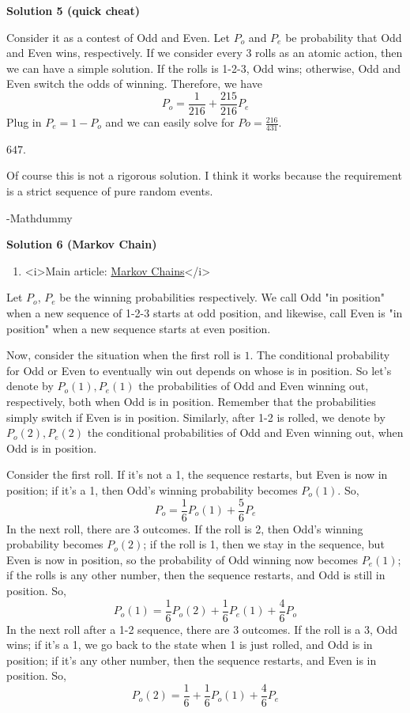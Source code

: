 \begin{enumerate}
 



\textbf{Solution 5 (quick cheat)}

Consider it as a contest of Odd and Even. Let $P_o$ and $P_e$ be probability that Odd and Even wins, respectively. If we consider every 3 rolls as an atomic action, then we can have a simple solution. If the rolls is 1-2-3, Odd wins; otherwise, Odd and Even switch the odds of winning. Therefore, we have
 \[P_o = \frac{1}{216} + \frac{215}{216}P_e\]Plug in $P_e = 1 - P_o$ and we can easily solve for $Po=\frac{216}{431}$. 

 $\boxed{647}$.

 Of course this is not a rigorous solution. I think it works because the requirement is a strict sequence of pure random events.

 -Mathdummy

 



\textbf{Solution 6 (Markov Chain)}


            \begin{enumerate}[label=(\roman*)]
                \item <i>Main article: \href{https://artofproblemsolving.com/wiki/index.php?title=Markov\_Chains}{Markov Chains}</i>
            \end{enumerate}
            Let $P_o$, $P_e$ be the winning probabilities respectively. We call Odd "in position" when a new sequence of 1-2-3 starts at odd position, and likewise, call Even is "in position" when a new sequence starts at even position. 

 Now, consider the situation when the first roll is $1.$ The conditional probability for Odd or Even to eventually win out depends on whose is in position. So let's denote by $P_o(1), P_e(1)$ the probabilities of Odd and Even winning out, respectively, both when Odd is in position. Remember that the probabilities simply switch if Even is in position. Similarly, after 1-2 is rolled, we denote by $P_o(2), P_e(2)$ the conditional probabilities of Odd and Even winning out, when Odd is in position.

 Consider the first roll. If it's not a 1, the sequence restarts, but Even is now in position; if it's a 1, then Odd's winning probability becomes $P_o(1)$. So,
 \[P_o = \frac{1}{6}P_o(1) + \frac{5}{6}P_e\]In the next roll, there are 3 outcomes. If the roll is 2, then Odd's winning probability becomes $P_o(2)$; if the roll is 1, then we stay in the sequence, but Even is now in position, so the probability of Odd winning now becomes $P_e(1)$; if the rolls is any other number, then the sequence restarts, and Odd is still in position. So,
 \[P_o(1) = \frac{1}{6}P_o(2) + \frac{1}{6}P_e(1) + \frac{4}{6}P_o\]In the next roll after a 1-2 sequence, there are 3 outcomes. If the roll is a 3, Odd wins; if it's a 1, we go back to the state when 1 is just rolled, and Odd is in position; if it's any other number, then the sequence restarts, and Even is in position. So,
 \[P_o(2) = \frac{1}{6} + \frac{1}{6}P_o(1) + \frac{4}{6}P_e\]


\end{enumerate}

